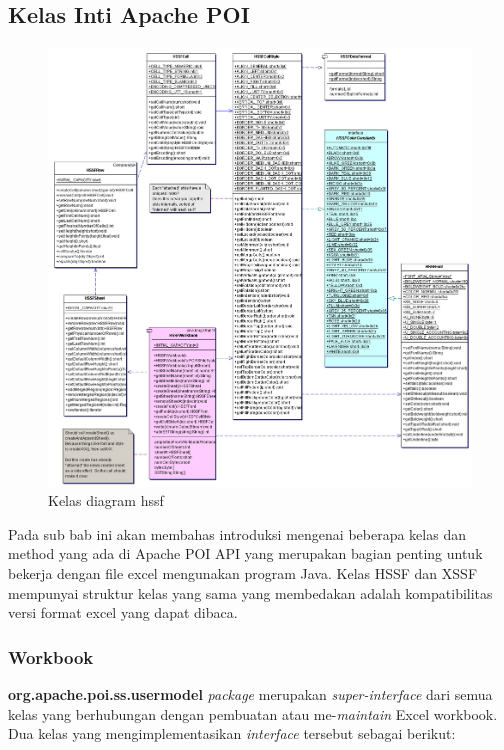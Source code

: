 \subsection{Kelas Inti Apache POI}
\label{subs:kelas_inti}

\begin{figure}[H]
	\centering
	\includegraphics[scale=0.3]{Gambar/hssf}
	\caption{Kelas diagram hssf}
\end{figure}

Pada sub bab ini akan membahas introduksi mengenai beberapa kelas dan method yang ada di Apache POI API yang merupakan bagian penting untuk bekerja dengan file excel mengunakan program Java. Kelas HSSF dan XSSF mempunyai struktur kelas yang sama yang membedakan adalah kompatibilitas versi format excel yang dapat dibaca. \cite{apachepoi2}

\subsubsection{Workbook}
\label{subs:workbook} 
\textbf{org.apache.poi.ss.usermodel} \textit{package} merupakan \textit{super-interface} dari semua kelas yang berhubungan dengan pembuatan atau me-\textit{maintain} Excel workbook. Dua kelas yang mengimplementasikan \textit{interface} tersebut sebagai berikut:\cite{apachepoi2}

